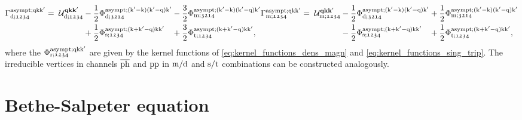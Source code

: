 \documentclass[../../main.tex]{subfiles}
\begin{document}
\begin{subequations}
\begin{equation}
\begin{alignedat}{3}
	\Gamma^{\asympt;\q\k\kp}_{\dens;\mathfrak{1234}}&=\;\mathcal{U}^{\vv{qkk}'}_{\dens;\mathfrak{1234}}&&-\frac12\Phi^{\asympt;(\kp-\k)(\kp-\q)\kp}_{\dens;\mathfrak{3214}}&&-\frac32\Phi^{\asympt;(\kp-\k)(\kp-\q)\kp}_{\magn;\mathfrak{3214}}\\
	&&&+\frac12\Phi_{\sing;\mathfrak{1234}}^{\asympt;(\k+\kp-\q)\k\kp}&&+\frac32\Phi_{\trip;\mathfrak{1234}}^{\asympt;(\k+\kp-\q)\k\kp},
\end{alignedat}
\end{equation}\\[-0.6cm]%
\begin{equation}
\begin{alignedat}{3}
	\Gamma^{\asympt;\q\k\kp}_{\magn;\mathfrak{1234}}&=\;\mathcal{U}^{\vv{qkk}'}_{\magn;\mathfrak{1234}} &&-\frac12\Phi^{\asympt;(\kp-\k)(\kp-\q)\kp}_{\dens;\mathfrak{3214}}&&+\frac12\Phi^{\asympt;(\kp-\k)(\kp-\q)\kp}_{\magn;\mathfrak{3214}}\\
	&&&-\frac12\Phi_{\sing;\mathfrak{1234}}^{\asympt;(\k+\kp-\q)\k\kp}&&+\frac12\Phi_{\trip;\mathfrak{1234}}^{\asympt;(\k+\kp-\q)\k\kp},
\end{alignedat}
\end{equation}
\end{subequations}
where the $\Phi_{\text{r};\mathfrak{1234}}^{\text{asympt};\text{q}\text{k}\text{k}'}$ are given by the kernel functions of \eqref{eq:kernel_functions_dens_magn} and \eqref{eq:kernel_functions_sing_trip}. The irreducible vertices in channels $\overline{\text{ph}}$ and $\text{pp}$ in $\text{m}/\text{d}$ and $\text{s}/\text{t}$ combinations can be constructed analogously.

\section{Bethe-Salpeter equation}\label{sec:bethe_salpeter}
\end{document}
